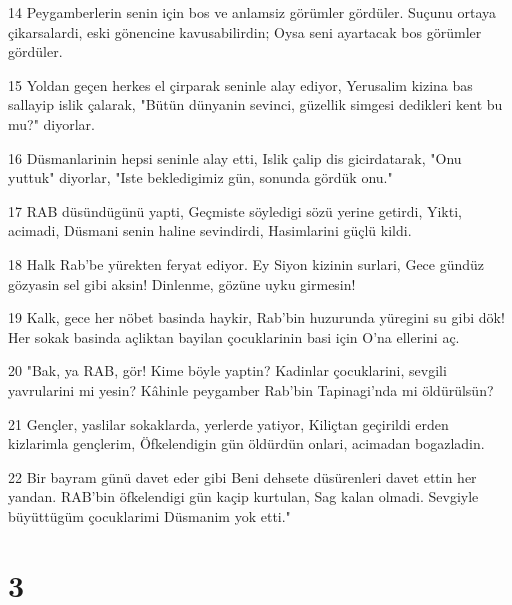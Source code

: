 \par 14 Peygamberlerin senin için bos ve anlamsiz görümler gördüler. Suçunu ortaya çikarsalardi, eski gönencine kavusabilirdin; Oysa seni ayartacak bos görümler gördüler.
\par 15 Yoldan geçen herkes el çirparak seninle alay ediyor, Yerusalim kizina bas sallayip islik çalarak, "Bütün dünyanin sevinci, güzellik simgesi dedikleri kent bu mu?" diyorlar.
\par 16 Düsmanlarinin hepsi seninle alay etti, Islik çalip dis gicirdatarak, "Onu yuttuk" diyorlar, "Iste bekledigimiz gün, sonunda gördük onu."
\par 17 RAB düsündügünü yapti, Geçmiste söyledigi sözü yerine getirdi, Yikti, acimadi, Düsmani senin haline sevindirdi, Hasimlarini güçlü kildi.
\par 18 Halk Rab'be yürekten feryat ediyor. Ey Siyon kizinin surlari, Gece gündüz gözyasin sel gibi aksin! Dinlenme, gözüne uyku girmesin!
\par 19 Kalk, gece her nöbet basinda haykir, Rab'bin huzurunda yüregini su gibi dök! Her sokak basinda açliktan bayilan çocuklarinin basi için O'na ellerini aç.
\par 20 "Bak, ya RAB, gör! Kime böyle yaptin? Kadinlar çocuklarini, sevgili yavrularini mi yesin? Kâhinle peygamber Rab'bin Tapinagi'nda mi öldürülsün?
\par 21 Gençler, yaslilar sokaklarda, yerlerde yatiyor, Kiliçtan geçirildi erden kizlarimla gençlerim, Öfkelendigin gün öldürdün onlari, acimadan bogazladin.
\par 22 Bir bayram günü davet eder gibi Beni dehsete düsürenleri davet ettin her yandan. RAB'bin öfkelendigi gün kaçip kurtulan, Sag kalan olmadi. Sevgiyle büyüttügüm çocuklarimi Düsmanim yok etti."

\chapter{3}

